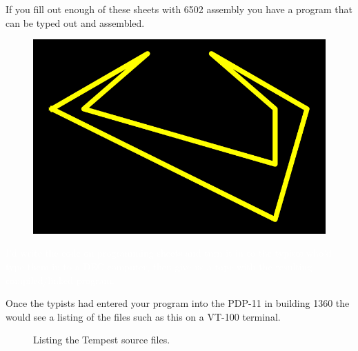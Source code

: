 If you fill out enough of these sheets with 6502 assembly you have a program that can be typed out and assembled. 
\begin{definition}
\setlength{\intextsep}{0pt}%
\setlength{\columnsep}{3pt}%
\begin{figure}
\includegraphics[width=\linewidth]{src/callout/claw_t.png} 
\end{figure}
\small
\textcolor{white}{
I’d write the code on programming sheets and turn it in to the typists
who’d type them in to a DEC computer, then give us a tape with the resulting
compiled/linked program.
}
\end{definition}

Once the typists had entered your program into the PDP-11 in building 1360 the would see a listing
of the files such as this on a VT-100 terminal.
\begin{figure}[H]
      \centering
    \caption{Listing the Tempest source files.}
\end{figure}


